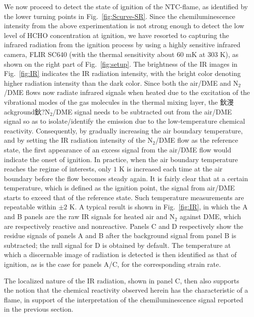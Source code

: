 \documentclass[review,3p,times]{elsarticleUS}
\begin{document}
We now proceed to detect the state of ignition of the NTC-flame, as identified by the lower turning points in Fig.~\ref{fig:Scurve-SR}.  Since the chemiluminescence intensity from the above experimentation is not strong enough to detect the low level of HCHO concentration at ignition, we have resorted to capturing the infrared radiation from the ignition process by using a highly sensitive infrared camera, FLIR SC640 (with the thermal sensitivity about $60$ mK at $303$ K), as shown on the right part of Fig.~\ref{fig:setup}.  The brightness of the IR images in Fig.~\ref{fig:IR} indicates the IR radiation intensity, with the bright color denoting higher radiation intensity than the dark color.  Since both the air/DME and N$_2$/DME flows now radiate infrared signals when heated due to the excitation of the vibrational modes of the gas molecules in the thermal mixing layer, the 鈥渂ackground鈥?N$_2$/DME signal needs to be subtracted out from the air/DME signal so as to isolate/identify the emission due to the low-temperature chemical reactivity.  Consequently, by gradually increasing the air boundary temperature, and by setting the IR radiation intensity of the N$_2$/DME flow as the reference state, the first appearance of an excess signal from the air/DME flow would indicate the onset of ignition.  In practice, when the air boundary temperature reaches the regime of interests, only $1$ K is increased each time at the air boundary before the flow becomes steady again.  It is fairly clear that at a certain temperature, which is defined as the ignition point, the signal from air/DME starts to exceed that of the reference state.  Such temperature measurements are repeatable within $\pm 2$ K.  A typical result is shown in Fig.~\ref{fig:IR}, in which the A and B panels are the raw IR signals for heated air and N$_2$ against DME, which are respectively reactive and nonreactive.  Panels C and D respectively show the residue signals of panels A and B after the background signal from panel B is subtracted; the null signal for D is obtained by default.  The temperature at which a discernable image of radiation is detected is then identified as that of ignition, as is the case for panels A/C, for the corresponding strain rate.

The localized nature of the IR radiation, shown in panel C, then also supports the notion that the chemical reactivity observed herein has the characteristic of a flame, in support of the interpretation of the chemiluminescence signal reported in the previous section.
\end{document}
